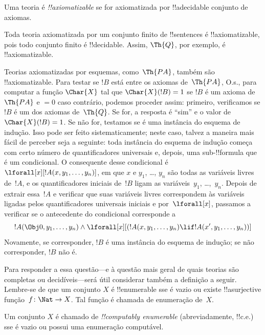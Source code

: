 \documentclass[../../../include/open-logic-section]{subfiles}
\begin{document}
\begin{defn}
Uma teoria é \emph{!!{axiomatizable}} se for axiomatizada por
!!a{decidable} conjunto de axiomas.
\end{defn}

\begin{ex}
Toda teoria axiomatizada por um conjunto finito de !!{sentence}s é
!!{axiomatizable}, pois todo conjunto finito é !!{decidable}. Assim,
$\Th{Q}$, por exemplo, é !!{axiomatizable}.

Teorias axiomatizadas por esquemas, como~$\Th{PA}$, também são
!!{axiomatizable}. Para testar se $!B$ está entre os axiomas
de~$\Th{PA}$, O.s.\@, para computar a função $\Char{X}$ tal que
$\Char{X}(!B) = 1$ se $!B$ é um axioma de~$\Th{PA}$ e $= 0$ caso
contrário, podemos proceder assim: primeiro, verificamos se $!B$ é um
dos axiomas de~$\Th{Q}$. Se for, a resposta é ``sim'' e o valor de
$\Char{X}(!B) = 1$. Se não for, testamos se é uma instância do esquema
de indução. Isso pode ser feito sistematicamente; neste caso, talvez a
maneira mais fácil de perceber seja a seguinte: toda instância do
esquema de indução começa com certo número de quantificadores
universais e, depois, uma sub-!!{formula} que é um condicional. O
consequente desse condicional é
$\lforall[x][!A(x, y_1, \dots, y_n)]$, em que $x$ e $y_1$, \dots,
$y_n$ são todas as variáveis livres de~$!A$, e os quantificadores
iniciais de~$!B$ ligam as variáveis~$y_1$, \dots,~$y_n$. Depois de
extrair essa~$!A$ e verificar que suas variáveis livres correspondem às
variáveis ligadas pelos quantificadores universais iniciais e
por~$\lforall[x]$, passamos a verificar se o antecedente do condicional
corresponde a
\[
!A(\Obj 0, y_1, \dots, y_n) \land \lforall[x][(!A(x, y_1, \dots, y_n)
\lif !A(x', y_1, \dots, y_n))]
\]
Novamente, se corresponder, $!B$ é uma instância do esquema de indução;
se não corresponder, $!B$ não é.
\end{ex}

Para responder a essa questão---e à questão mais geral de quais teorias
são completas ou decidíveis---será útil considerar também a definição
a seguir. Lembre-se de que um conjunto $X$ é !!{enumerable} sse é vazio
ou existe !!a{surjective} função~$f \colon \Nat \to X$. Tal função é
chamada de enumeração de~$X$.

\begin{defn}
Um conjunto $X$ é chamado de \emph{!!{computably enumerable}}
(abreviadamente, !!{c.e.}) sse é vazio ou possui uma enumeração
computável.
\end{defn}
\end{document}
